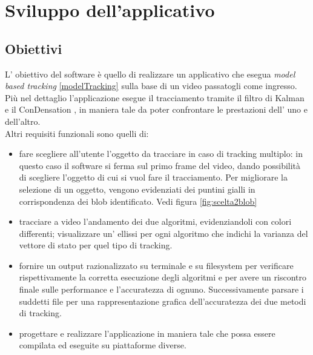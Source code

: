 
\section{Sviluppo dell'applicativo}\label{sec:software}

\subsection{Obiettivi}
L' obiettivo del software è quello di realizzare un applicativo che esegua \textit{model based tracking} \ref{modelTracking} sulla base di un video passatogli come ingresso. Più nel dettaglio l'applicazione esegue il tracciamento tramite il filtro di Kalman \cite{kalman-intro} e il ConDensation \cite{kalman-condense}, in maniera tale da poter confrontare le prestazioni dell' uno e dell'altro.\\
Altri requisiti funzionali sono quelli di:

\begin{itemize}
 \item  fare scegliere all'utente l'oggetto da tracciare in caso di tracking multiplo: in questo caso il software si ferma sul primo frame del video, dando possibilità di scegliere l'oggetto di cui si vuol fare il tracciamento. Per migliorare la selezione di un oggetto, vengono evidenziati dei puntini gialli in corrispondenza dei blob identificato. Vedi figura \ref{fig:scelta2blob}

\item tracciare a video l'andamento dei due algoritmi, evidenziandoli con colori differenti; visualizzare un' ellissi per ogni algoritmo che indichi la varianza del vettore di stato per quel tipo di tracking.

\item fornire un output razionalizzato su terminale e su filesystem per verificare rispettivamente la corretta esecuzione degli algoritmi e per avere un riscontro finale sulle performance e l'accuratezza di ognuno. Successivamente parsare i suddetti file per una rappresentazione grafica dell'accuratezza dei due metodi di tracking.

\item progettare e realizzare l'applicazione in maniera tale che possa essere compilata ed eseguite su piattaforme diverse.


\end{itemize}

